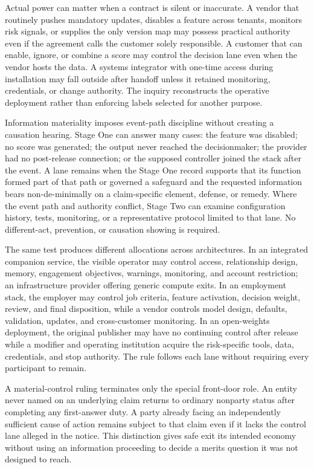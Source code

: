 Actual power can matter when a contract is silent or inaccurate. A vendor that routinely pushes mandatory updates, disables a feature across tenants, monitors risk signals, or supplies the only version map may possess practical authority even if the agreement calls the customer solely responsible. A customer that can enable, ignore, or combine a score may control the decision lane even when the vendor hosts the data. A systems integrator with one-time access during installation may fall outside after handoff unless it retained monitoring, credentials, or change authority. The inquiry reconstructs the operative deployment rather than enforcing labels selected for another purpose.

Information materiality imposes event-path discipline without creating a causation hearing. Stage One can answer many cases: the feature was disabled; no score was generated; the output never reached the decisionmaker; the provider had no post-release connection; or the supposed controller joined the stack after the event. A lane remains when the Stage One record supports that its function formed part of that path or governed a safeguard and the requested information bears non-de-minimally on a claim-specific element, defense, or remedy. Where the event path and authority conflict, Stage Two can examine configuration history, tests, monitoring, or a representative protocol limited to that lane. No different-act, prevention, or causation showing is required.

The same test produces different allocations across architectures. In an integrated companion service, the visible operator may control access, relationship design, memory, engagement objectives, warnings, monitoring, and account restriction; an infrastructure provider offering generic compute exits. In an employment stack, the employer may control job criteria, feature activation, decision weight, review, and final disposition, while a vendor controls model design, defaults, validation, updates, and cross-customer monitoring. In an open-weights deployment, the original publisher may have no continuing control after release while a modifier and operating institution acquire the risk-specific tools, data, credentials, and stop authority. The rule follows each lane without requiring every participant to remain.

A material-control ruling terminates only the special front-door role. An entity never named on an underlying claim returns to ordinary nonparty status after completing any first-answer duty. A party already facing an independently sufficient cause of action remains subject to that claim even if it lacks the control lane alleged in the notice. This distinction gives safe exit its intended economy without using an information proceeding to decide a merits question it was not designed to reach.

